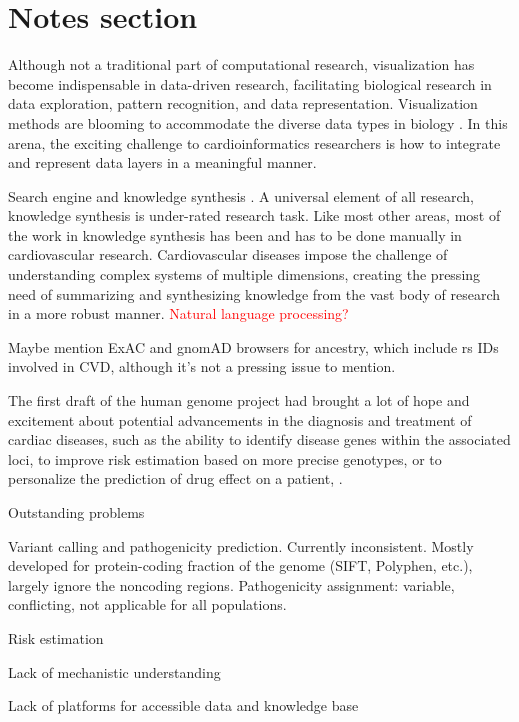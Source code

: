 \documentclass[letter]{bioinfo}
\newcommand{\comment}[1]{\textcolor{red}{#1}}
\begin{document}
	
	\section*{Notes section}
	
	Although not a traditional part of computational research, visualization has become indispensable in data-driven research, facilitating biological research in data exploration, pattern recognition, and data representation. Visualization methods are blooming to accommodate the diverse data types in biology \citep{Pavlopoulos:2015:Visualizing}. In this arena, the exciting challenge to cardioinformatics researchers is how to integrate and represent data layers in a meaningful manner.
		
		
	Search engine and knowledge synthesis \citep{Lutjohann:2011:Sciencenet}. A universal element of all research, knowledge synthesis is under-rated research task. Like most other areas, most of the work in knowledge synthesis has been and has to be done manually in cardiovascular research. Cardiovascular diseases impose the challenge of understanding complex systems of multiple dimensions, creating the pressing need of summarizing and synthesizing knowledge from the vast body of research in a more robust manner. \comment{Natural language processing?}
		
		
	
	Maybe mention ExAC and gnomAD browsers for ancestry, which include rs IDs involved in CVD, although it's not a pressing issue to mention.
	
	The first draft of the human genome project had brought a lot of hope and excitement about potential advancements in the diagnosis and treatment of cardiac diseases, such as the ability to identify disease genes within the associated loci, to improve risk estimation based on more precise genotypes, or to personalize the prediction of drug effect on a patient, \citep{Komajda:2001:heart}.
	
	
	Outstanding problems
	
	Variant calling and pathogenicity prediction. Currently inconsistent. Mostly developed for protein-coding fraction of the genome (SIFT, Polyphen, etc.), largely ignore the noncoding regions.
	Pathogenicity assignment: variable, conflicting, not applicable for all populations.
	
	Risk estimation
	
	Lack of mechanistic understanding
	
	Lack of platforms for accessible data and knowledge base
	
\end{document}
